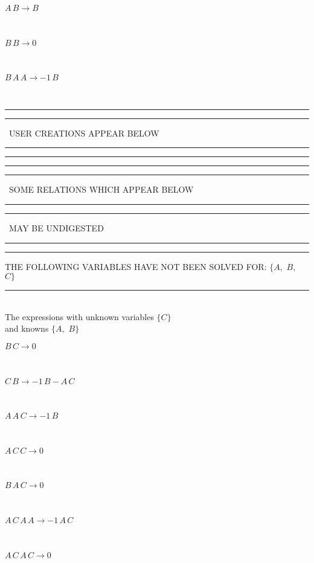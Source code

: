 \begin{minipage}{6in}
$
A\,
 B\rightarrow B
$
\end{minipage}\medskip \\
\begin{minipage}{6in}
$
B\,
 B\rightarrow 0
$
\end{minipage}\medskip \\
\begin{minipage}{6in}
$
B\,
 A\,
 A\rightarrow -1\,
 B
$
\end{minipage}\\
\rule[2pt]{6in}{1pt}\hfil\break
\rule[2.5pt]{1.701in}{1pt}
\ USER CREATIONS APPEAR BELOW\ 
\rule[2.5pt]{1.701in}{1pt}\hfil\break
\rule[2pt]{6in}{1pt}\hfil\break
\rule[2pt]{6in}{4pt}\hfil\break
\rule[2pt]{1.45in}{4pt}
\ SOME RELATIONS WHICH APPEAR BELOW\ 
\rule[2pt]{1.45in}{4pt}\hfil\break
\rule[2pt]{2.18in}{4pt}
\ MAY BE UNDIGESTED\ 
\rule[2pt]{2.18in}{4pt}\hfil\break
\rule[2pt]{6in}{4pt}\hfil\break
THE FOLLOWING VARIABLES HAVE NOT BEEN SOLVED FOR:\hfil\break
$\{A,
$ $
B,
$ $
C\}$
\smallskip\\
\rule[3pt]{6in}{.7pt}\\
The expressions with unknown variables $\{C\}$\\
and knowns $\{A,
$ $
B\}$\smallskip\\
\begin{minipage}{6in}
$
B\,
 C\rightarrow 0
$
\end{minipage}\medskip \\
\begin{minipage}{6in}
$
C\,
 B\rightarrow -1\,
 B - A\,
 C
$
\end{minipage}\medskip \\
\begin{minipage}{6in}
$
A\,
 A\,
 C\rightarrow -1\,
 B
$
\end{minipage}\medskip \\
\begin{minipage}{6in}
$
A\,
 C\,
 C\rightarrow 0
$
\end{minipage}\medskip \\
\begin{minipage}{6in}
$
B\,
 A\,
 C\rightarrow 0
$
\end{minipage}\medskip \\
\begin{minipage}{6in}
$
A\,
 C\,
 A\,
 A\rightarrow -1\,
 A\,
 C
$
\end{minipage}\medskip \\
\begin{minipage}{6in}
$
A\,
 C\,
 A\,
 C\rightarrow 0
$
\end{minipage}\\
\vspace{10pt}

